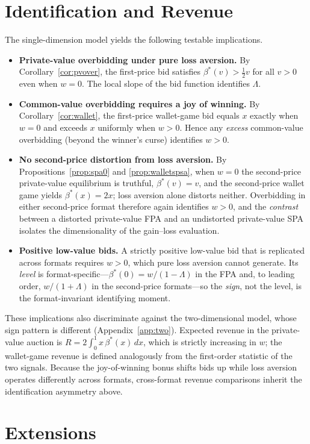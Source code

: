 \documentclass[11pt,a4paper]{article}
\theoremstyle{remark}
\begin{document}
\section{Identification and Revenue}
\label{sec:id}
The single-dimension model yields the following testable implications.
\begin{itemize}
\item \textbf{Private-value overbidding under pure loss aversion.} By
Corollary~\ref{cor:pvover}, the first-price bid satisfies $\beta^*(v)>\tfrac12 v$ for
all $v>0$ even when $w=0$. The local slope of the bid function identifies $\Lambda$.
\item \textbf{Common-value overbidding requires a joy of winning.} By
Corollary~\ref{cor:wallet}, the first-price wallet-game bid equals $x$ exactly when
$w=0$ and exceeds $x$ uniformly when $w>0$. Hence any \emph{excess} common-value
overbidding (beyond the winner's curse) identifies $w>0$.
\item \textbf{No second-price distortion from loss aversion.} By
Propositions~\ref{prop:spa0} and \ref{prop:walletspsa}, when $w=0$ the second-price
private-value equilibrium is truthful, $\beta^{*}(v)=v$, and the second-price wallet
game yields $\beta^{*}(x)=2x$; loss aversion alone distorts neither. Overbidding in
either second-price format therefore again identifies $w>0$, and the \emph{contrast}
between a distorted private-value FPA and an undistorted private-value SPA isolates the
dimensionality of the gain--loss evaluation.
\item \textbf{Positive low-value bids.} A strictly positive low-value bid that is
replicated across formats requires $w>0$, which pure loss aversion cannot generate. Its
\emph{level} is format-specific---$\beta^{*}(0)=w/(1-\Lambda)$ in the FPA and, to
leading order, $w/(1+\Lambda)$ in the second-price formats---so the \emph{sign}, not
the level, is the format-invariant identifying moment.
\end{itemize}
These implications also discriminate against the two-dimensional model, whose sign
pattern is different (Appendix~\ref{app:two}).
Expected revenue in the private-value auction is
$R=2\int_0^1 x\,\beta^*(x)\,dx$, which is strictly increasing in $w$; the
wallet-game revenue is defined analogously from the first-order statistic of the two
signals. Because the joy-of-winning bonus shifts bids up while loss aversion
operates differently across formats, cross-format revenue comparisons inherit the
identification asymmetry above.
\section{Extensions}
\label{sec:ext}
\end{document}
